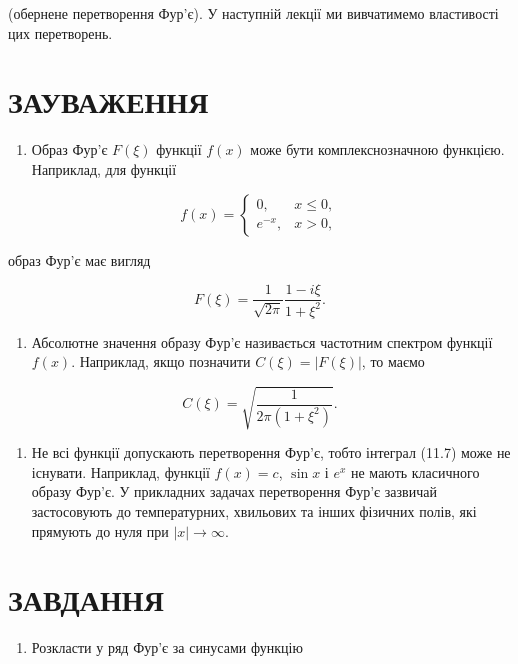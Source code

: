 (обернене перетворення Фур'є). У наступній лекції ми вивчатимемо властивості цих перетворень.

\section{ЗАУВАЖЕННЯ}\label{ux437ux430ux443ux432ux430ux436ux435ux43dux43dux44f-7}

\begin{enumerate}
\def\labelenumi{\arabic{enumi}.}
\tightlist
\item
  Образ Фур'є \(F(\xi)\) функції \(f(x)\) може бути комплекснозначною функцією. Наприклад, для функції
\end{enumerate}

\[
f(x)=
\begin{cases}
0, & x \le 0,\\
e^{-x}, & x > 0,
\end{cases}
\]

образ Фур'є має вигляд

\[
F(\xi) = \frac{1}{\sqrt{2\pi}} \frac{1-i\xi}{1+\xi^2}.
\]

\begin{enumerate}
\def\labelenumi{\arabic{enumi}.}
\setcounter{enumi}{1}
\tightlist
\item
  Абсолютне значення образу Фур'є називається частотним спектром функції \(f(x)\). Наприклад, якщо позначити \(C(\xi)=|F(\xi)|\), то маємо
\end{enumerate}

\[
C(\xi) = \sqrt{\frac{1}{2\pi(1+\xi^2)}}.
\]

\begin{enumerate}
\def\labelenumi{\arabic{enumi}.}
\setcounter{enumi}{2}
\tightlist
\item
  Не всі функції допускають перетворення Фур'є, тобто інтеграл (11.7) може не існувати. Наприклад, функції \(f(x)=c\), \(\sin x\) і \(e^x\) не мають класичного образу Фур'є. У прикладних задачах перетворення Фур'є зазвичай застосовують до температурних, хвильових та інших фізичних полів, які прямують до нуля при \(|x|\to\infty\).
\end{enumerate}

\section{ЗАВДАННЯ}\label{ux437ux430ux432ux434ux430ux43dux43dux44f-9}

\begin{enumerate}
\def\labelenumi{\arabic{enumi}.}
\tightlist
\item
  Розкласти у ряд Фур'є за синусами функцію
\end{enumerate}

